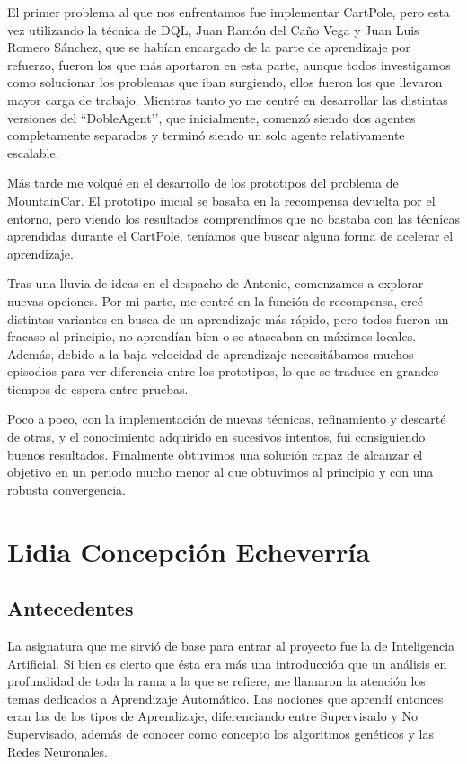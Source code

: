 El primer problema al que nos enfrentamos fue implementar CartPole, pero esta vez utilizando la técnica de DQL, Juan Ramón del Caño Vega y Juan Luis Romero Sánchez, que se habían encargado de la parte de aprendizaje por refuerzo, fueron los que más aportaron en esta parte, aunque todos investigamos como solucionar los problemas que iban surgiendo, ellos fueron los que llevaron mayor carga de trabajo. Mientras tanto yo me centré en desarrollar las distintas versiones del ``DobleAgent’’, que inicialmente, comenzó siendo dos agentes completamente separados y terminó siendo un solo agente relativamente escalable. 

Más tarde me volqué en el desarrollo de los prototipos del problema de MountainCar. El prototipo inicial se basaba en la recompensa devuelta por el entorno, pero viendo los resultados comprendimos que no bastaba con las técnicas aprendidas durante el CartPole, teníamos que buscar alguna forma de acelerar el aprendizaje.

Tras una lluvia de ideas en el despacho de Antonio, comenzamos a explorar nuevas opciones. Por mi parte, me centré en la función de recompensa, creé distintas variantes en busca de un aprendizaje más rápido, pero todos fueron un fracaso al principio, no aprendían bien o se atascaban en máximos locales. Además, debido a la baja velocidad de aprendizaje necesitábamos muchos episodios para ver diferencia entre los prototipos, lo que se traduce en grandes tiempos de espera entre pruebas. 

Poco a poco, con la implementación de nuevas técnicas, refinamiento y descarté de otras, y el conocimiento adquirido en sucesivos intentos, fui consiguiendo buenos resultados. Finalmente obtuvimos una solución capaz de alcanzar el objetivo en un periodo mucho menor al que obtuvimos al principio y con una robusta convergencia.


\section{Lidia Concepción Echeverría}
\subsection{Antecedentes}

La asignatura que me sirvió de base para entrar al proyecto fue la de Inteligencia Artificial. Si bien es cierto que ésta era más una introducción que un análisis en profundidad de toda la rama a la que se refiere, me llamaron la atención los temas dedicados a Aprendizaje Automático. Las nociones que aprendí entonces eran las de los tipos de Aprendizaje, diferenciando entre Supervisado y No Supervisado, además de conocer como concepto los algoritmos genéticos y las Redes Neuronales. 

